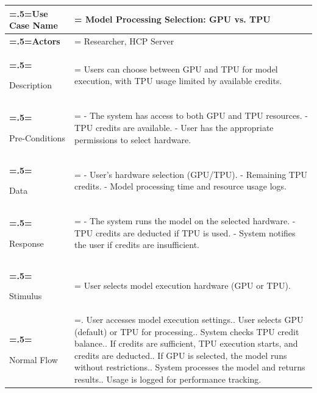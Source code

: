 \begin{table}[H] 
  \centering
  \footnotesize
  \begin{tabularx}{\textwidth}{|>{\bfseries\hsize=.5\hsize\linewidth=\hsize}X|
  >{\hsize=1.5\hsize\linewidth=\hsize}X|}
  \hline
  Use Case Name       & Model Processing Selection: GPU vs. TPU \\ \hline
  
  Actors              & Researcher, HCP Server \\ \hline
  
  Description         & Users can choose between GPU and TPU for model execution, with TPU usage limited by available credits. \\ \hline
  
  Pre-Conditions      & 
  - The system has access to both GPU and TPU resources.\newline
  - TPU credits are available.\newline
  - User has the appropriate permissions to select hardware. \\ \hline
  
  Data                & 
  - User’s hardware selection (GPU/TPU).\newline
  - Remaining TPU credits.\newline
  - Model processing time and resource usage logs. \\ \hline
  
  Response            & 
  - The system runs the model on the selected hardware.\newline
  - TPU credits are deducted if TPU is used.\newline
  - System notifies the user if credits are insufficient. \\ \hline
  
  Stimulus            & User selects model execution hardware (GPU or TPU). \\ \hline
  
  Normal Flow         & 
  1. User accesses model execution settings.\newline
  2. User selects GPU (default) or TPU for processing.\newline
  3. System checks TPU credit balance.\newline
  4. If credits are sufficient, TPU execution starts, and credits are deducted.\newline
  5. If GPU is selected, the model runs without restrictions.\newline
  6. System processes the model and returns results.\newline
  7. Usage is logged for performance tracking. \\ \hline
  

\end{tabularx}
\end{table}
